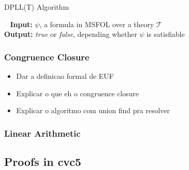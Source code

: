 \begin{algorithm}[H]
\caption{DPLL(T) Algorithm}~\label{dpllTAlgo}
    \hspace*{\algorithmicindent} \textbf{Input:} $\psi$, a formula in MSFOL over a theory  $\mathcal{T}$ \\
    \hspace*{\algorithmicindent} \textbf{Output:} \textit{true} or \textit{false}, depending whether $\psi$ is satisfiable
\begin{algorithmic}
\EndFunction
\end{algorithmic}
\end{algorithm}

\subsubsection{Congruence Closure}

\begin{itemize}
  \item Dar a definicao formal de EUF
  \item Explicar o que eh o congruence closure
  \item Explicar o algoritmo com union find pra resolver
\end{itemize}

\subsubsection{Linear Arithmetic}


\subsection{Proofs in cvc5}
